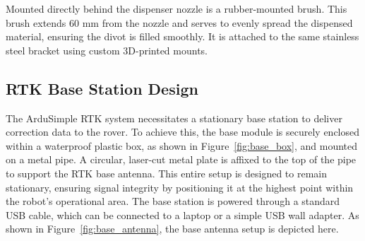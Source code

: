 Mounted directly behind the dispenser nozzle is a rubber-mounted brush. This brush extends 60 mm from the nozzle and serves to evenly spread the dispensed material, ensuring the divot is filled smoothly. It is attached to the same stainless steel bracket using custom 3D-printed mounts.

\subsection{RTK Base Station Design}
\label{ssec:rtk_base_design}
The ArduSimple RTK system necessitates a stationary base station to deliver correction data to the rover. To achieve this, the base module is securely enclosed within a waterproof plastic box, as shown in Figure~\ref{fig:base_box}, and mounted on a metal pipe. A circular, laser-cut metal plate is affixed to the top of the pipe to support the RTK base antenna. This entire setup is designed to remain stationary, ensuring signal integrity by positioning it at the highest point within the robot's operational area. The base station is powered through a standard \gls{USB} cable, which can be connected to a laptop or a simple USB wall adapter. As shown in Figure~\ref{fig:base_antenna}, the base antenna setup is depicted here.

